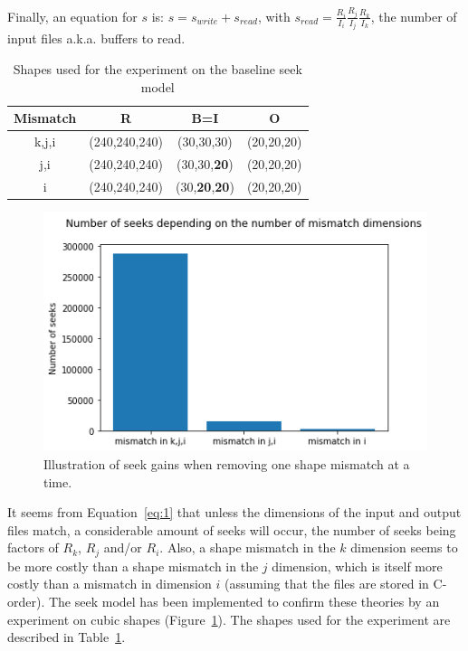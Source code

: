 \documentclass[conference]{IEEEtran}
\begin{document}
Finally, an equation for $s$ is: $s = s_{write} + s_{read}$,
with $s_{read} = \frac{R_i}{I_i} \frac{R_j}{I_j} \frac{R_k}{I_k}$, the number of
input files a.k.a. buffers to read.


 \begin{table}[ht]
  \centering
  \caption{Shapes used for the experiment on the baseline seek model}

   \begin{tabular}[t]{c c c c}
   \hline
   Mismatch & R & B=I & O \\
     \hline\hline
     k,j,i & (240,240,240) & (30,30,30) & (20,20,20) \\
     \hline
     j,i & (240,240,240) & (30,30,\textbf{20}) & (20,20,20) \\
     \hline
     i & (240,240,240) & (30,\textbf{20},\textbf{20}) & (20,20,20) \\
     \hline
   \end{tabular}

   \label{tab:expseekmodel}

\end{table}

\begin{figure}[h]
\centering
\includegraphics[scale=0.55]{./figures/baseline_math_model.png}
\caption{Illustration of seek gains when removing one shape mismatch at a time.
}
\label{fig:baseline_math_model}
\end{figure}

It seems from Equation~\ref{eq:1} that unless the dimensions of the input and
output files match, a considerable amount of seeks will occur, the number of
seeks being factors of $R_k$, $R_j$ and/or $R_i$. Also, a shape mismatch in the
$k$ dimension seems to be more costly than a shape mismatch in the $j$ dimension,
which is itself more costly than a mismatch in dimension $i$ (assuming that the
files are stored in C-order). The seek model has been implemented to confirm
these theories by an experiment on cubic shapes
(Figure~\ref{fig:baseline_math_model}). The shapes used for the experiment are
described in Table~\ref{tab:expseekmodel}.
\end{document}
